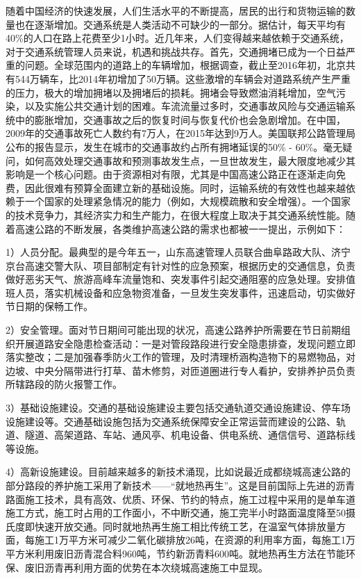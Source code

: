 随着中国经济的快速发展，人们生活水平的不断提高，居民的出行和货物运输的数量也在逐渐增加。交通系统是人类活动不可缺少的一部分。据估计，每天平均有40\%的人口在路上花费至少1小时。近几年来，人们变得越来越依赖于交通系统，对于交通系统管理人员来说，机遇和挑战共存。首先，交通拥堵已成为一个日益严重的问题。全球范围内的道路上的车辆增加，根据调查，截止至2016年初，北京共有544万辆车，比2014年初增加了50万辆。这些激增的车辆会对道路系统产生严重的压力，极大的增加拥堵以及拥堵后的损耗。拥堵会导致燃油消耗增加，空气污染，以及实施公共交通计划的困难。车流流量过多时，交通事故风险与交通运输系统中的膨胀增加，交通事故之后的恢复时间与恢复代价也会急剧增加。在中国，2009年的交通事故死亡人数约有7万人，在2015年达到9万人。美国联邦公路管理局公布的报告显示，发生在城市的交通事故约占所有拥堵延误的50\% - 60\%。毫无疑问，如何高效处理交通事故和预测事故发生点，一旦世故发生，最大限度地减少其影响是一个核心问题。由于资源相对有限，尤其是中国高速公路正在逐渐走向免费，因此很难有预算全面建立新的基础设施。同时，运输系统的有效性也越来越依赖于一个国家的处理紧急情况的能力（例如，大规模疏散和安全增强）。一个国家的技术竞争力，其经济实力和生产能力，在很大程度上取决于其交通系统性能。随着高速公路的不断发展，各类维护高速公路的需求也都被一一提出，示例如下：

1）人员分配。最典型的是今年五一，山东高速管理人员联合曲阜路政大队、济宁京台高速交警大队、项目部制定有针对性的应急预案，根据历史的交通信息，负责做好恶劣天气、旅游高峰车流量饱和、突发事件引起交通阻塞的应急处理。安排值班人员，落实机械设备和应急物资准备，一旦发生突发事件，迅速启动，切实做好节日期的保畅工作。

2）安全管理。面对节日期间可能出现的状况，高速公路养护所需要在节日前期组织开展道路安全隐患检查活动：一是对管段路段进行安全隐患排查，发现问题立即落实整改；二是加强春季防火工作的管理，及时清理桥涵构造物下的易燃物品，对边坡、中央分隔带进行打草、苗木修剪，对匝道圈进行专人看护，安排养护员负责所辖路段的防火报警工作。

3）基础设施建设。交通的基础设施建设主要包括交通轨道交通设施建设、停车场设施建设等。交通基础设施包括为交通系统保障安全正常运营而建设的公路、轨道、隧道、高架道路、车站、通风亭、机电设备、供电系统、通信信号、道路标线等设施。

4）高新设施建设。目前越来越多的新技术涌现，比如说最近成都绕城高速公路的部分路段的养护施工采用了新技术——“就地热再生”。这是目前国际上先进的沥青路面施工技术，具有高效、优质、环保、节约的特点，施工过程中采用的是单车道施工方式，施工时占用的工作面小，不中断交通，施工完半小时路面温度降至50摄氏度即快速开放交通。同时就地热再生施工相比传统工艺，在温室气体排放量方面，每施工1万平方米可减少二氧化碳排放26吨，在资源的利用率方面，每施工1万平方米利用废旧沥青混合料960吨，节约新沥青料600吨。就地热再生方法在节能环保、废旧沥青再利用方面的优势在本次绕城高速施工中显现。


